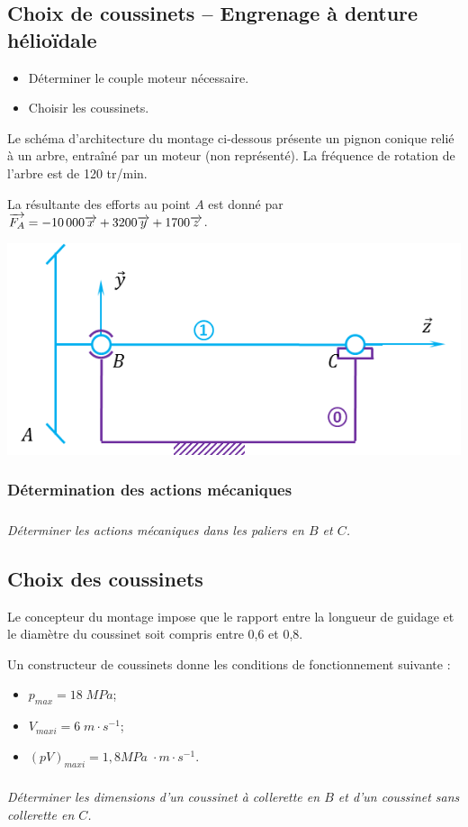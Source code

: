 \documentclass[10pt]{article}
\begin{document}
\newpage

\subsection*{Choix de coussinets -- Engrenage à denture hélioïdale}
\setcounter{subparagraph}{0}
\begin{obj}
\begin{itemize}
\item Déterminer le couple moteur nécessaire.
\item Choisir les coussinets.
\end{itemize}
\end{obj}


Le schéma d'architecture du montage ci-dessous présente un pignon conique relié à un arbre,  entraîné par un moteur (non représenté). La fréquence de rotation de l'arbre est de 120 tr/min.

La résultante des efforts au point $A$ est donné par $\overrightarrow{F_A} = -10\,000\overrightarrow{x} +3200\overrightarrow{y} + 1700\overrightarrow{z}$.

\begin{center}
\includegraphics[width=.75\textwidth]{images/modele2}
\end{center}

\subsubsection*{Détermination des actions mécaniques}

\subparagraph{}
\textit{Déterminer les actions mécaniques dans les paliers en $B$ et $C$.}

\subsection*{Choix des coussinets}
Le concepteur du montage impose que le rapport entre la longueur de guidage et le diamètre du coussinet soit compris entre 0,6 et 0,8.

Un constructeur de coussinets donne les conditions de fonctionnement suivante : 
\begin{itemize}
\item $p_{max}=18 \; MPa$;
\item $V_{maxi}= 6\; m\cdot s^{-1}$;
\item $(pV)_{maxi} = 1,8 MPa \; \cdot m\cdot s^{-1}$.
\end{itemize}

\subparagraph{}
\textit{Déterminer les dimensions d'un coussinet à collerette en $B$ et d'un coussinet sans collerette en $C$.}
\end{document}
